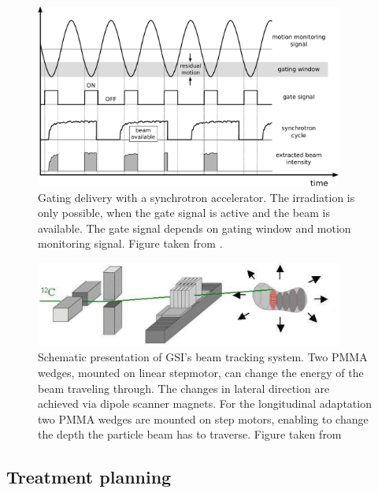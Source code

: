 \begin{figure}[tbp]
  \centering
  \includegraphics[width=0.9\textwidth]{./Fundamentals/Images/gatingscheme.pdf}
  \caption{Gating delivery with a synchrotron accelerator. The irradiation is only possible, when the gate signal is active and the beam is available. The gate signal
  depends on gating window and motion monitoring signal. Figure taken from \cite{Richter2012}.}
  \label{gating}
\end{figure}

\newpage
\begin{figure}[H]
\begin{center}
\includegraphics[width=0.9\textwidth]{./Fundamentals/Images/tracking.png}
\caption{Schematic presentation of GSI's beam tracking system. Two PMMA wedges, mounted on linear stepmotor, can change the energy of the beam traveling through. The changes in lateral direction are achieved via dipole scanner magnets. For the longitudinal adaptation two 
PMMA wedges are mounted on step motors, enabling to change the depth the particle beam has to traverse. Figure taken from \cite{Groezinger2004}}
\label{tracking}
\end{center}
\end{figure}

\subsection{Treatment planning}
\label{treatmentPlanning}

